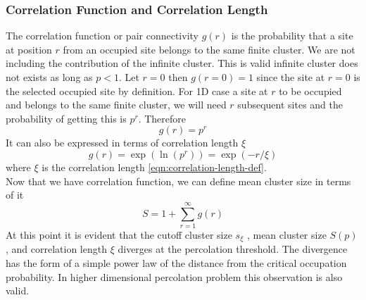 		\subsubsection{Correlation Function and Correlation Length}
		The correlation function or pair connectivity $g(r)$ is the probability that a site at position $r$ from an occupied site belongs to the same finite cluster. We are not including the contribution of the infinite cluster. This is valid infinite cluster does not exists as long as $p<1$. Let $r=0$ then $g(r=0)=1$ since the site at $r=0$ is the selected occupied site by definition. For 1D case a site at $r$ to be occupied and belongs to the same finite cluster, we will need $r$ subsequent sites and the probability of getting this is $p^r$. Therefore
		\begin{equation}
			g(r) = p^r
		\end{equation}
		It can also be expressed in terms of correlation length $\xi$
		\begin{equation}
			g(r) = \exp (\ln(p^r)) = \exp(-r/\xi)
		\end{equation}
		where $\xi$ is the correlation length \ref{eqn:correlation-length-def}.\\
		Now that we have correlation function, we can define mean cluster size in terms of it
		\begin{equation}
			S = 1 + \sum_{r=1}^{\infty} g(r)
			\label{eqn:mean-cluster-size-correlation-function}
		\end{equation}
		At this point it is evident that the cutoff cluster size $s_\xi$ , mean cluster size $S(p)$, and correlation length $\xi$ diverges at the percolation threshold. The divergence has the form of a	simple power law of the distance from the critical occupation probability. In higher dimensional percolation problem this observation is also valid.
		
